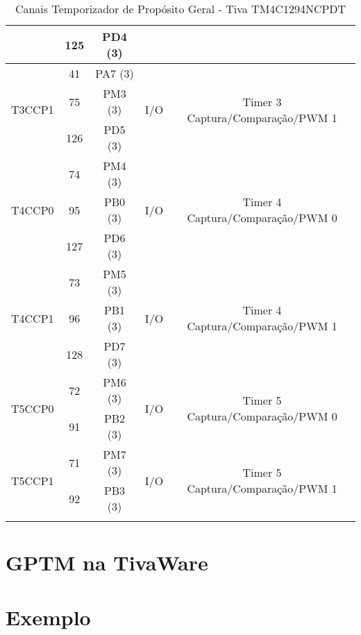 \begin{center}
\begin{longtable}{|c|c|c|c|c|}
		& 125 & PD4 (3) &     &                                 \\ \hline
		\multirow{3}{*}{T3CCP1}    & 41  & PA7 (3) & \multirow{3}{*}{I/O} & \multirow{3}{*}{Timer 3 Captura/Comparação/PWM 1}\\
		& 75  & PM3 (3) &     &                                 \\ 
		& 126 & PD5 (3) &     &                                 \\ \hline
		\multirow{3}{*}{T4CCP0}    & 74  & PM4 (3) & \multirow{3}{*}{I/O} & \multirow{3}{*}{Timer 4 Captura/Comparação/PWM 0}\\
		& 95  & PB0 (3) &     &                                 \\ 
		& 127 & PD6 (3) &     &                                 \\ \hline
		\multirow{3}{*}{T4CCP1}    & 73  & PM5 (3) & \multirow{3}{*}{I/O} & \multirow{3}{*}{Timer 4 Captura/Comparação/PWM 1}\\
		& 96  & PB1 (3) &     &                                 \\ 
		& 128 & PD7 (3) &     &                                 \\ \hline
		\multirow{2}{*}{T5CCP0}    & 72  & PM6 (3) & \multirow{2}{*}{I/O} & \multirow{2}{*}{Timer 5 Captura/Comparação/PWM 0}\\
		& 91  & PB2 (3) &     &                                 \\ \hline
		\multirow{2}{*}{T5CCP1}    & 71  & PM7 (3) & \multirow{2}{*}{I/O} & \multirow{2}{*}{Timer 5 Captura/Comparação/PWM 1}\\
		& 92  & PB3 (3) &     &                                 \\ \hline
		\caption{Canais Temporizador de Propósito Geral - Tiva TM4C1294NCPDT \cite{DATASHEET_TIVA} }
		\label{tab:CanaisTimer}
	\end{longtable}
\end{center}

\section{GPTM na TivaWare}

\section{Exemplo}